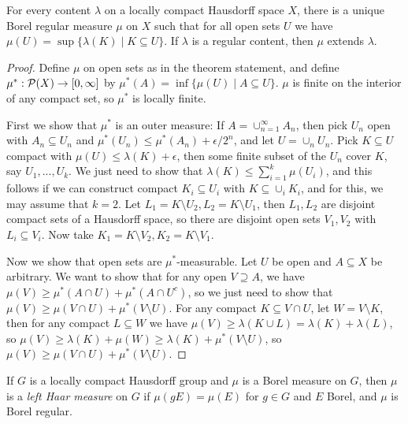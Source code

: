 \documentclass[letterpaper,11pt]{report}
\begin{document}
\begin{lem}\label{content-measure} For every content $\lambda$ on a locally compact Hausdorff space $X$, there is a unique Borel regular measure $\mu$ on $X$ such that for all open sets $U$ we have $\mu(U) = \sup\{\lambda(K) \mid K \subseteq U\}$. If $\lambda$ is a regular content, then $\mu$ extends $\lambda$.
\end{lem}
\begin{proof} Define $\mu$ on open sets as in the theorem statement, and define $\mu^* : \mathcal{P}(X) \rightarrow [0,\infty]$ by $\mu^*(A) = \inf \{\mu(U) \mid A \subseteq U\}$. $\mu$ is finite on the interior of any compact set, so $\mu^*$ is locally finite.

First we show that $\mu^*$ is an outer measure: If $A = \cup_{n=1}^\infty A_n$, then pick $U_n$ open with $A_n \subseteq U_n$ and $\mu^*(U_n) \le \mu^*(A_n) + \epsilon/2^n$, and let $U = \cup_n U_n$. Pick $K \subseteq U$ compact with $\mu(U) \le \lambda(K) + \epsilon$, then some finite subset of the $U_n$ cover $K$, say $U_1, ..., U_k$. We just need to show that $\lambda(K) \le \sum_{i=1}^k \mu(U_i)$, and this follows if we can construct compact $K_i \subseteq U_i$ with $K \subseteq \cup_i K_i$, and for this, we may assume that $k = 2$. Let $L_1 = K\setminus U_2, L_2 = K\setminus U_1$, then $L_1,L_2$ are disjoint compact sets of a Hausdorff space, so there are disjoint open sets $V_1, V_2$ with $L_i \subseteq V_i$. Now take $K_1 = K\setminus V_2, K_2 = K \setminus V_1$.

Now we show that open sets are $\mu^*$-measurable. Let $U$ be open and $A\subseteq X$ be arbitrary. We want to show that for any open $V \supseteq A$, we have $\mu(V) \ge \mu^*(A\cap U) + \mu^*(A\cap U^c)$, so we just need to show that $\mu(V) \ge \mu(V\cap U) + \mu^*(V\setminus U)$. For any compact $K \subseteq V\cap U$, let $W = V \setminus K$, then for any compact $L \subseteq W$ we have $\mu(V) \ge \lambda(K\cup L) = \lambda(K) + \lambda(L)$, so $\mu(V) \ge \lambda(K) + \mu(W) \ge \lambda(K) + \mu^*(V\setminus U)$, so $\mu(V) \ge \mu(V\cap U) + \mu^*(V\setminus U)$.
\end{proof}

\begin{defn} If $G$ is a locally compact Hausdorff group and $\mu$ is a Borel measure on $G$, then $\mu$ is a \emph{left Haar measure} on $G$ if $\mu(gE) = \mu(E)$ for $g \in G$ and $E$ Borel, and $\mu$ is Borel regular.
\end{defn}
\end{document}
